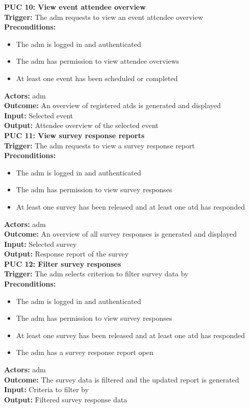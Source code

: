 \documentclass[12pt]{article}
\begin{document}
{\textbf{PUC 10: View event attendee overview} \\
\textbf{Trigger:} The \gls{adm} requests to view an event attendee overview \\
\textbf{Preconditions:}
\begin{itemize}
  \item The \gls{adm} is logged in and authenticated
  \item The \gls{adm} has permission to view attendee overviews
  \item At least one event has been scheduled or completed
\end{itemize}
\textbf{Actors:} \Gls{adm} \\
\textbf{Outcome:} An overview of registered \glspl{atd} is generated and displayed \\
\textbf{Input:} Selected event \\
\textbf{Output:} Attendee overview of the selected event \\[1em]

\textbf{PUC 11: View survey response reports} \\
\textbf{Trigger:} The \gls{adm} requests to view a survey response report \\
\textbf{Preconditions:}
\begin{itemize}
  \item The \gls{adm} is logged in and authenticated
  \item The \gls{adm} has permission to view survey responses
  \item At least one survey has been released and at least one \gls{atd} has responded
\end{itemize}
\textbf{Actors:} \Gls{adm} \\
\textbf{Outcome:} An overview of all survey responses is generated and displayed \\
\textbf{Input:} Selected survey \\
\textbf{Output:} Response report of the survey \\[1em]

\textbf{PUC 12: Filter survey responses} \\
\textbf{Trigger:} The \gls{adm} selects criterion to filter survey data by \\
\textbf{Preconditions:}
\begin{itemize}
  \item The \gls{adm} is logged in and authenticated
  \item The \gls{adm} has permission to view survey responses
  \item At least one survey has been released and at least one \gls{atd} has responded
  \item The \gls{adm} has a survey response report open
\end{itemize}
\textbf{Actors:} \Gls{adm} \\
\textbf{Outcome:} The survey data is filtered and the updated report is generated \\
\textbf{Input:} Criteria to filter by \\
\textbf{Output:} Filtered survey response data \\[1em]

}
\end{document}
